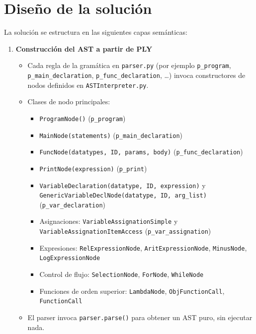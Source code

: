 \documentclass{article}
\begin{document}
\section{Diseño de la solución}\label{sec:dis}

La solución se estructura en las siguientes capas semánticas:

\begin{enumerate}
  \item \textbf{Construcción del AST a partir de PLY}  
    \begin{itemize}
      \item Cada regla de la gramática en \texttt{parser.py} (por ejemplo \texttt{p\_program}, \texttt{p\_main\_declaration}, \texttt{p\_func\_declaration}, \ldots) invoca constructores de nodos definidos en \texttt{ASTInterpreter.py}.
      \item Clases de nodo principales:
        \begin{itemize}
          \item \texttt{ProgramNode()} (\texttt{p\_program})
          \item \texttt{MainNode(statements)} (\texttt{p\_main\_declaration})
          \item \texttt{FuncNode(datatypes, ID, params, body)} (\texttt{p\_func\_declaration})
          \item \texttt{PrintNode(expression)} (\texttt{p\_print})
          \item \texttt{VariableDeclaration(datatype, ID, expression)} y \texttt{GenericVariableDeclNode(datatype, ID, arg\_list)} (\texttt{p\_var\_declaration})
          \item Asignaciones: \texttt{VariableAssignationSimple} y \texttt{VariableAssignationItemAccess} (\texttt{p\_var\_assignation})
          \item Expresiones: \texttt{RelExpressionNode}, \texttt{AritExpressionNode}, \texttt{MinusNode}, \texttt{LogExpressionNode}
          \item Control de flujo: \texttt{SelectionNode}, \texttt{ForNode}, \texttt{WhileNode}
          \item Funciones de orden superior: \texttt{LambdaNode}, \texttt{ObjFunctionCall}, \texttt{FunctionCall}
        \end{itemize}
      \item El parser invoca \texttt{parser.parse()} para obtener un AST puro, sin ejecutar nada.
    \end{itemize}


\end{enumerate}
\end{document}
